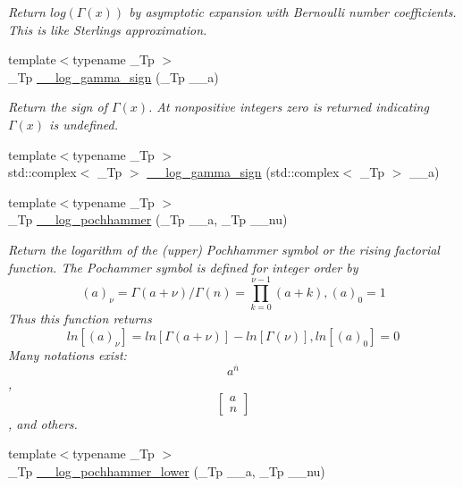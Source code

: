 \begin{DoxyCompactItemize}
\begin{DoxyCompactList}\small\item\em Return $log(\Gamma(x))$ by asymptotic expansion with Bernoulli number coefficients. This is like Sterling\textquotesingle{}s approximation. \end{DoxyCompactList}\item 
{\footnotesize template$<$typename \+\_\+\+Tp $>$ }\\\+\_\+\+Tp \hyperlink{namespacestd_1_1____detail_ab17ef141874b20a302d5c142cf304542}{\+\_\+\+\_\+log\+\_\+gamma\+\_\+sign} (\+\_\+\+Tp \+\_\+\+\_\+a)
\begin{DoxyCompactList}\small\item\em Return the sign of $ \Gamma(x) $. At nonpositive integers zero is returned indicating $ \Gamma(x) $ is undefined. \end{DoxyCompactList}\item 
{\footnotesize template$<$typename \+\_\+\+Tp $>$ }\\std\+::complex$<$ \+\_\+\+Tp $>$ \hyperlink{namespacestd_1_1____detail_a4c87b679d9fa1ac20ebe3cb85becb266}{\+\_\+\+\_\+log\+\_\+gamma\+\_\+sign} (std\+::complex$<$ \+\_\+\+Tp $>$ \+\_\+\+\_\+a)
\item 
{\footnotesize template$<$typename \+\_\+\+Tp $>$ }\\\+\_\+\+Tp \hyperlink{namespacestd_1_1____detail_a662ea050ddbb017ae6f5f981e95d8e71}{\+\_\+\+\_\+log\+\_\+pochhammer} (\+\_\+\+Tp \+\_\+\+\_\+a, \+\_\+\+Tp \+\_\+\+\_\+nu)
\begin{DoxyCompactList}\small\item\em Return the logarithm of the (upper) Pochhammer symbol or the rising factorial function. The Pochammer symbol is defined for integer order by \[ (a)_\nu = \Gamma(a + \nu) / \Gamma(n) = \prod_{k=0}^{\nu-1} (a + k), (a)_0 = 1 \] Thus this function returns \[ ln[(a)_\nu] = ln[\Gamma(a + \nu)] - ln[\Gamma(\nu)], ln[(a)_0] = 0 \] Many notations exist\+: \[ a^{\overline{n}} \], \[ \left[ \begin{array}{c} a \\ n \end{array} \right] \], and others. \end{DoxyCompactList}\item 
{\footnotesize template$<$typename \+\_\+\+Tp $>$ }\\\+\_\+\+Tp \hyperlink{namespacestd_1_1____detail_ac647507ca578c270d3cd7a4c02e68dbb}{\+\_\+\+\_\+log\+\_\+pochhammer\+\_\+lower} (\+\_\+\+Tp \+\_\+\+\_\+a, \+\_\+\+Tp \+\_\+\+\_\+nu)

\end{DoxyCompactItemize}
